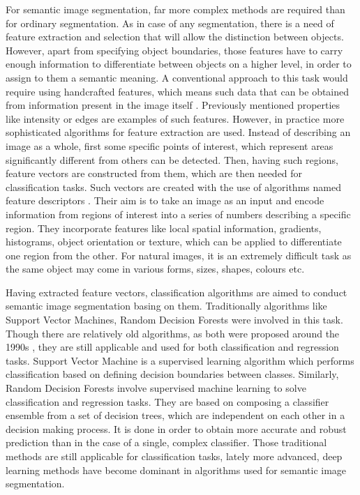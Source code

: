 For semantic image segmentation, far more complex methods are required than for ordinary segmentation. As in case of any segmentation, there is a need of feature extraction and selection that will allow the distinction between objects. However, apart from specifying object boundaries, those features have to carry enough information to differentiate between objects on a higher level, in order to assign to them a semantic meaning. A conventional approach to this task would require using handcrafted features, which means such data that can be obtained from information present in the image itself \cite{segmentation_methods_descriptors}. Previously mentioned properties like intensity or edges are examples of such features. However, in practice more sophisticated algorithms for feature extraction are used. Instead of describing an image as a whole, first some specific points of interest, which represent areas significantly different from others can be detected. Then, having such regions, feature vectors are constructed from them, which are then needed for classification tasks. Such vectors are created with the use of algorithms named feature descriptors \cite{segmentation_methods_descriptors_2}. Their aim is to take an image as an input and encode information from regions of interest into a series of numbers describing a specific region. They incorporate features like local spatial information, gradients, histograms, object orientation or texture, which can be applied to differentiate one region from the other. For natural images, it is an extremely difficult task as the same object may come in various forms, sizes, shapes, colours etc. 

Having extracted feature vectors, classification algorithms are aimed to conduct semantic image segmentation basing on them. Traditionally algorithms like Support Vector Machines, Random Decision Forests were involved in this task. Though there are relatively old algorithms, as both were proposed around the 1990s \cite{decision_forests} \cite{Cortes1995},  they are still applicable and used for both classification and regression tasks. Support Vector Machine is a supervised learning algorithm which performs classification based on defining decision boundaries between classes. Similarly, Random Decision Forests involve supervised machine learning to solve classification and regression tasks. They are based on composing a classifier ensemble from a set of decision trees, which are independent on each other in a decision making process. It is done in order to obtain more accurate and robust prediction than in the case of a single, complex classifier. Those traditional methods are still applicable for classification tasks, lately more advanced, deep learning methods have become dominant in algorithms used for semantic image segmentation. 

